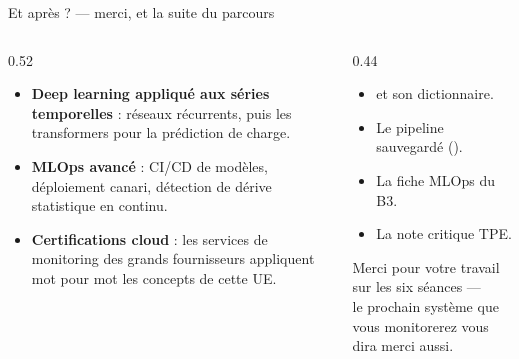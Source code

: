 \begin{frame}{Et après ? --- merci, et la suite du parcours}
\begin{columns}[t]
\begin{column}{0.52\textwidth}
\begin{kbox}
\begin{itemize}
\item \textbf{Deep learning appliqué aux séries temporelles} : réseaux
récurrents, puis les transformers pour la prédiction de charge.
\item \textbf{MLOps avancé} : CI/CD de modèles, déploiement canari,
détection de dérive statistique en continu.
\item \textbf{Certifications cloud} : les services de monitoring des grands
fournisseurs appliquent mot pour mot les concepts de cette UE.
\end{itemize}
\end{kbox}
\end{column}
\begin{column}{0.44\textwidth}
\begin{ebox}
\begin{itemize}
\item {} et son dictionnaire.
\item Le pipeline sauvegardé ().
\item La fiche MLOps du B3.
\item La note critique TPE.
\end{itemize}
\end{ebox}
\begin{center}\small
Merci pour votre travail sur les six séances ---\\
le prochain système que vous monitorerez vous dira merci aussi.
\end{center}
\end{column}
\end{columns}
\end{frame}
